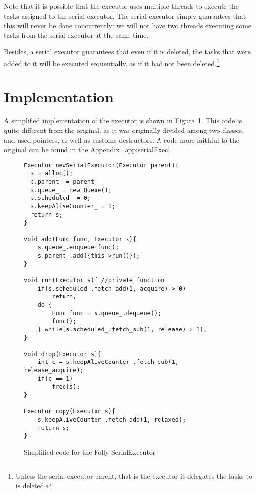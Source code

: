 Note that it is possible that the executor uses multiple threads to execute the tasks assigned to the serial executor. The serial executor simply guarantees that this will never be done concurrently: we will not have two threads executing some tasks from the serial executor at the same time.

Besides, a serial executor guarantees that even if it is deleted, the tasks that were added to it will be executed sequentially, as if it had not been deleted.\footnote{Unless the serial executor parent, that is the executor it delegates the tasks to is deleted.}



\section{Implementation}
A simplified implementation of the executor is shown in Figure~\ref{fig:simplSerialExec}. This code is quite different from the original, as it was originally divided among two classes, and used pointers, as well as customs destructors. A code more faithful to the original can be found in the Appendix~\ref{app:serialExec}. 

\begin{figure}
	\begin{lstlisting}
Executor newSerialExecutor(Executor parent){
  s = alloc();
  s.parent_ = parent;
  s.queue_ = new Queue();
  s.scheduled_ = 0;
  s.keepAliveCounter_ = 1;
  return s;
}

void add(Func func, Executor s){
	s.queue_.enqueue(func);
	s.parent_.add({this->run()});
}

void run(Executor s){ //private function
	if(s.scheduled_.fetch_add(1, acquire) > 0)
		return;
	do {
		Func func = s.queue_.dequeue();
		func();
	} while(s.scheduled_.fetch_sub(1, release) > 1);
}

void drop(Executor s){
	int c = s.keepAliveCounter_.fetch_sub(1, release_acquire);
	if(c == 1)
		free(s);
}

Executor copy(Executor s){
	s.keepAliveCounter_.fetch_add(1, relaxed);
	return s;
}
	\end{lstlisting}

		\caption{Simplified code for the Folly SerialExecutor}
\label{fig:simplSerialExec}
\end{figure}


